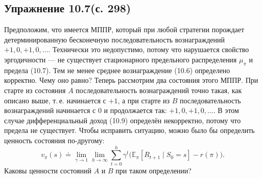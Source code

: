 \subsection{Упражнение 10.7(с. 298)}
Предположим, что имеется МППР, который при любой стратегии порождает
детерминированную бесконечную последовательность вознаграждений $+1, 0, +1, 0,
\dots$. Технически это недопустимо, потому что нарушается свойство эргодичности
--- не существует стационарного предельного распределения $\mu_\pi$ и предела
(10.7). Тем не менее среднее вознаграждение (10.6) определено корректно. Чему оно
равно? Теперь рассмотрим два состояния этого МППР. При старте из состояния $A$
последовательность вознаграждений точно такая, как описано выше, т.\,е. начинается
с $+1$, а при старте из $B$ последовательность вознаграждений начинается с $0$ и
продолжается так: $+1, 0, +1, 0, \dots$. В этом случае дифференциальный доход
(10.9) определён некорректно, потому что предела не существует. Чтобы исправить
ситуацию, можно было бы определить ценность состояния по-другому:
\begin{equation}
    v_\pi(s) \doteq \lim_{\gamma\to1}\lim_{h\to\infty}
    \sum_{t=0}^{h} \gamma^t\big(\mathbb E_\pi[R_{t+1}\mid S_0=s]-r(\pi)\big).
    \tag{10.13}
\end{equation}
Каковы ценности состояний $A$ и $B$ при таком определении?
